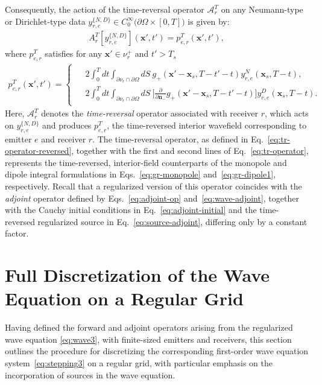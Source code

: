 \documentclass[11pt,reqno]{amsart}
\theoremstyle{remark}
\theoremstyle{italic_lemma}
\newcommand{\bx}{\boldsymbol{x}}
\newcommand{\bn}{\boldsymbol{n}}
\begin{document}
Consequently, the action of the time-reversal operator $\mathcal{A}_r^T$ on any Neumann-type or Dirichlet-type data $ y_{r,e}^{\{N,D\} }  \in C_0^{\infty} \big( \partial \Omega \times [0,T] \big) $ is given by:
\begin{align}  \label{eq:tr-operator-reversed}
    A_r^T[ y_{r,e}^{ \{N,D\} }](\bx', t') = p_{e,r}^T(\bx', t'),
\end{align}
where $p_{e,r}^T$ satisfies for any \(\bx' \in \nu_r^+\) and \(t'>T_s\)
\begin{align} \label{eq:tr-operator}
p_{e,r}^T(\bx', t')  = 
    \begin{cases}
    \begin{split}
    &2\int_0^T dt \int_{\partial \nu_r \cap \partial \Omega} dS \   g_+(\bx' -\bx_s, T-t'-t)  y_{r,e}^{N}(\bx_s, T-t),\\
      &2\int_0^T dt \int_{\partial \nu_r \cap \partial \Omega} dS \ \Big[ \frac{\partial }{\partial \bn_-} g_+(\bx'-\bx_s, T-t'-t) \Big] y_{r,e}^D (\bx_s, T-t).
    \end{split}
    \end{cases}
\end{align}
Here, \( \mathcal{A}_r^T \) denotes the \textit{time-reversal} operator associated with receiver \(r\), which acts on \( y_{r,e}^{\{N,D\}} \) and produces \( p_{e,r}^T \), the time-reversed interior wavefield corresponding to emitter \(e\) and receiver \(r\). The time-reversal operator, as defined in Eq.~\eqref{eq:tr-operator-reversed}, together with the first and second lines of Eq.~\eqref{eq:tr-operator}, represents the time-reversed, interior-field counterparts of the monopole and dipole integral formulations in Eqs.~\eqref{eq:gr-monopole} and~\eqref{eq:gr-dipole1}, respectively. Recall that a regularized version of this operator coincides with the \emph{adjoint} operator defined by 
Eqs.~\eqref{eq:adjoint-op} and~\eqref{eq:wave-adjoint}, together with the Cauchy 
initial conditions in Eq.~\eqref{eq:adjoint-initial} and the time-reversed 
regularized source in Eq.~\eqref{eq:source-adjoint}, differing only by a 
constant factor.





\section{Full Discretization of the Wave Equation on a Regular Grid}
\label{sec:wave-discretised}

Having defined the forward and adjoint operators arising from the regularized wave equation \eqref{eq:wave3}, with finite-sized emitters and receivers, this section outlines the procedure for discretizing the corresponding first-order wave equation system~\eqref{eq:stepping3} on a regular grid, with particular emphasis on the incorporation of sources in the wave equation.
\end{document}
